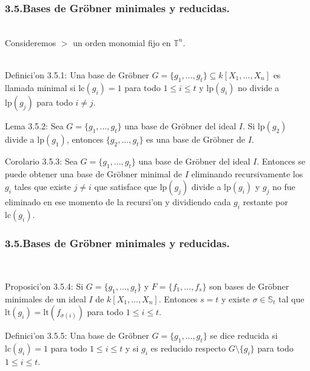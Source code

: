 \documentclass[10pt]{beamer}
\renewcommand{\T}{\mathbb{T}^n}
\renewcommand{\lp}{\text{lp}}
\renewcommand{\lt}{\text{lt}}
\renewcommand{\lc}{\text{lc}}
\begin{document}
\begin{frame}
\frametitle{3.5.Bases de Gr\"obner minimales y reducidas.}\\
Consideremos $>$ un orden monomial fijo en $\T$.\\
\\
\begin{block}{Definici'on 3.5.1:}
Una base de Gr\"obner $G=\{g_1,...,g_t\} \subseteq k[X_1,...,X_n]$ es llamada minimal si $\lc(g_i)=1$ para todo $1 \leq i \leq t$ y $\lp (g_i)$ no divide a $\lp (g_j)$ para todo $i \not = j$.\\
\end{block}
\begin{block}{Lema 3.5.2:}
Sea $G=\{g_1,...,g_t \}$ una base de Gr\"obner del ideal $I$. Si $\lp (g_2)$ divide a $\lp(g_1)$, entonces $\{g_2,...,g_t\}$ es una base de Gr\"obner de $I$.\\
\end{block}
\begin{block}{Corolario 3.5.3:}
Sea $G=\{g_1,...,g_t\}$ una base de Gr\"obner del ideal $I$. Entonces se puede obtener una base de Gr\"obner minimal de $I$ eliminando recursivamente los $g_i$ tales que existe $j \not = i$ que satisface que $\lp (g_j)$ divide a $\lp(g_i)$ y $g_j$ no fue eliminado en ese momento de la recursi'on y dividiendo cada $g_i$ restante por $\lc (g_i)$.\\
\end{block}
\end{frame}


\begin{frame}
\frametitle{3.5.Bases de Gr\"obner minimales y reducidas.}\\
\begin{block}{Proposici'on 3.5.4:}
Si $G=\{g_1,...,g_t\}$ y $F=\{f_1,...,f_s\}$ son bases de Gr\"obner minimales de un ideal $I$ de $k[X_1,...,X_n]$. Entonces $s=t$ y existe $\sigma \in \mathbb{S}_t$ tal que $\lt(g_i)=\lt(f_{\sigma(i)})$ para todo $1 \leq i \leq t$.\\
\end{block}
\begin{block}{Definici'on 3.5.5:}
Una base de Gr\"obner $G=\{g_1,...,g_t\}$ se dice reducida si $\lc (g_i)=1$ para todo $1 \leq i \leq t$ y si $g_i$ es reducido respecto $G \setminus \{g_i\}$ para todo $1 \leq i \leq t$.\\
\end{block}
\vspace{6cm}
\end{frame}
\end{document}
